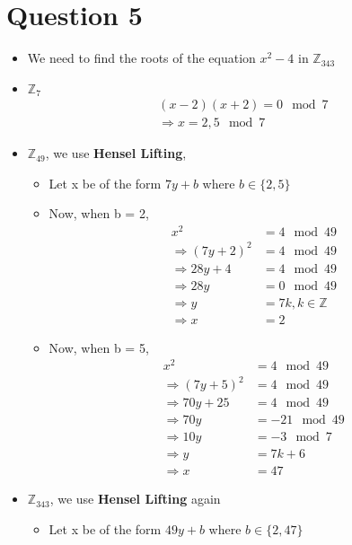 \documentclass{article}
\theoremstyle{mytheoremstyle}
\theoremstyle{mytheoremstyle}
\theoremstyle{myproblemstyle}
\begin{document}
\section{Question 5}
\begin{itemize}
    \item We need to find the roots of the equation $x^2 - 4$ in $\mathbb{Z}_{343}$
    \item $\mathbb{Z}_{7}$
    \begin{align*}
        (x-2)(x+2) = 0 \mod 7 \\
        \Rightarrow x = 2, 5 \mod 7
    \end{align*}
    \item  $\mathbb{Z}_{49}$, we use \textbf{Hensel Lifting},
    \begin{itemize}
        \item Let x be of the form $7y+b$ where $b \in \{2,5\}$
        \item Now, when b = 2,
        \begin{align*}
            x^2 &= 4 \mod 49 \\
            \Rightarrow {(7y+2)}^2 &= 4\mod 49 \\
            \Rightarrow 28y + 4 &= 4 \mod 49 \\
            \Rightarrow 28y &= 0 \mod 49 \\
            \Rightarrow y &= 7k, k \in \mathbb{Z} \\
            \Rightarrow x &= 2
        \end{align*}
        \item Now, when b = 5,
        \begin{align*}
            x^2 &= 4 \mod 49 \\
            \Rightarrow {(7y+5)}^2 &= 4\mod 49 \\
            \Rightarrow 70y + 25 &= 4 \mod 49 \\
            \Rightarrow 70y &= -21 \mod 49 \\
            \Rightarrow 10y &= -3 \mod 7 \\
            \Rightarrow y &= 7k +6 \\
            \Rightarrow x &= 47
        \end{align*}
    \end{itemize}
    \item $\mathbb{Z}_{343}$, we use \textbf{Hensel Lifting} again
    \begin{itemize}
        \item Let x be of the form $49y+b$ where $b \in \{2,47\}$

\end{itemize}
\end{itemize}
\end{document}
